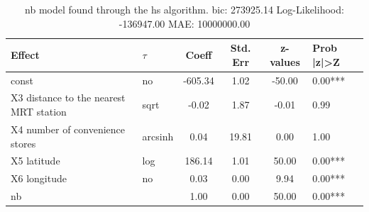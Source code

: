 \begin{table}
	\caption{nb model found through the hs algorithm. bic: 273925.14 Log-Likelihood: -136947.00 MAE: 10000000.00}
	\begin{center}
		\begin{tabular}{|l|l|c|c|c|l|}
			\hline
			Effect & $\tau$ & Coeff & Std. Err & z-values & Prob |z|>Z \\
			\hline
			const & no & -605.34 & 1.02 & -50.00 & 0.00*** \\
			\hline
			X3 distance to the nearest MRT station & sqrt & -0.02 & 1.87 & -0.01 & 0.99 \\
			\hline
			X4 number of convenience stores & arcsinh & 0.04 & 19.81 & 0.00 & 1.00 \\
			\hline
			X5 latitude & log & 186.14 & 1.01 & 50.00 & 0.00*** \\
			\hline
			X6 longitude & no & 0.03 & 0.00 & 9.94 & 0.00*** \\
			\hline
			nb &  & 1.00 & 0.00 & 50.00 & 0.00*** \\
			\hline
		\end{tabular}
	\end{center}
\end{table}